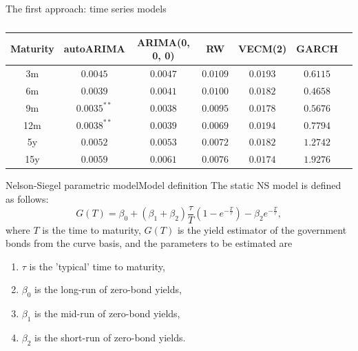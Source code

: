 \documentclass[aspectratio=169]{beamer}
\begin{document}
    \begin{frame}{The first approach: time series models}
        \begin{table}
            \centering
            \begin{tabular}{|c c c c c c c|} 
                \hline
                Maturity & autoARIMA & ARIMA(0, 0, 0) & RW & VECM(2) & GARCH \\
                \hline
                3m & $0.0045$ & $0.0047$ & $0.0109$ & $0.0193$ & $0.6115$ \\ 
                \hline
                6m & $0.0039$  & 0.$0041$ & $0.0100$ & $0.0182$ & $0.4658$ \\
                \hline
                9m & $0.0035^{**}$ & $0.0038$ & $0.0095$ & $0.0178$ & $0.5676$ \\
                \hline
                12m & $0.0038^{**}$ & $0.0039$ & $0.0069$ & $0.0194$ & $0.7794$ \\
                \hline
                5y & $0.0052$ & $0.0053$ & $0.0072$ & $0.0182$ & $1.2742$\\
                \hline
                15y & $0.0059$ & $0.0061$ & $0.0076$ & $0.0174$ & $1.9276$ \\ 
                \hline
            \end{tabular}
            \caption{}
        \end{table}

    \end{frame}

    \begin{frame}{Nelson-Siegel parametric model}{Model definition}
        The static NS model is defined as follows:
            \begin{equation}\label{eq:NS}
                G(T) = \beta_0 + (\beta_1+\beta_2)\frac{\tau}{T}\left(1-e^{-\frac{T}{\tau}}\right)-\beta_2  e^{-\frac{T}{\tau}},
            \end{equation}
            where $T$ is the time to maturity, $G(T)$ is the yield estimator of the government bonds from the curve basis, 
            and the parameters to be estimated are
            \begin{enumerate}
                \item $\tau$ is the 'typical' time to maturity, 
                \item $\beta_0$ is the long-run of zero-bond yields, 
                \item $\beta_1$ is the mid-run of zero-bond yields, 
                \item $\beta_2$ is the short-run of zero-bond yields.
            \end{enumerate}
    \end{frame}
\end{document}
